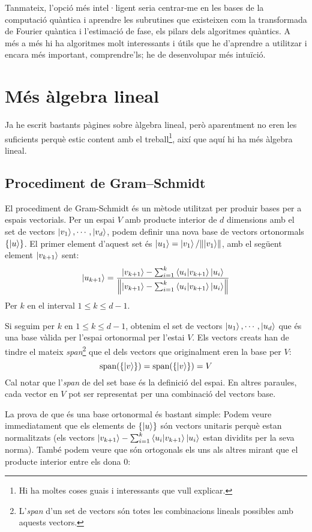 Tanmateix, l'opció més intel·ligent seria centrar-me en les bases de la computació quàntica i aprendre les subrutines que existeixen com la transformada de Fourier quàntica i l'estimació de fase, els pilars dels algoritmes quàntics. A més a més hi ha algoritmes molt interessants i útils que he d'aprendre a utilitzar i encara més important, comprendre'ls; he de desenvolupar més intuïció.

\chapter{Més àlgebra lineal}
Ja he escrit bastants pàgines sobre àlgebra lineal, però aparentment no eren les suficients perquè estic content amb el treball\footnote{Hi ha moltes coses guais i interessants que vull explicar.}, així que aquí hi ha més àlgebra lineal.


\section{Procediment de Gram–Schmidt}\label{gram}
El procediment de Gram-Schmidt és un mètode utilitzat per produir bases per a espais vectorials\cite{QCandQI:GramSchmidt}. Per un espai $V$ amb producte interior de $d$ dimensions amb el set de vectors ${\ket{v_1}, \cdots, \ket{v_d}}$, podem definir una nova base de vectors ortonormals $\{\ket{u}\}$. El primer element d'aquest set és $\ket{u_1} = \ket{v_1}/\norm{\ket{v_1}}$, amb el següent element $\ket{v_{k+1}}$ sent:
$$
\ket{u_{k+1}} = \frac{\ket{v_{k+1}} - \sum_{i=1}^{k} \bra{u_i}\ket{v_{k+1}}\ket{u_i}}{\norm{\ket{v_{k+1}} - \sum_{i=1}^{k} \bra{u_i}\ket{v_{k+1}}\ket{u_i}}}
$$
Per $k$ en el interval $1 \leq k \leq d-1$.

Si seguim per $k$ en $1 \leq k \leq d-1$, obtenim el set de vectors ${\ket{u_1}, \cdots , \ket{u_d}}$ que és una base vàlida per l'espai ortonormal per l'estai $V$. Els vectors creats han de tindre el mateix \textit{span}\footnote{L'\textit{span} d'un set de vectors són totes les combinacions lineals possibles amb aquests vectors.} que el dels vectors que originalment eren la base per $V$:
$$
\text{span}(\{\ket{v}\}) = \text{span}(\{\ket{v}\}) = V
$$
Cal notar que l'\textit{span} de del set base és la definició del espai. En altres paraules, cada vector en $V$ pot ser representat per una combinació del vectors base. 

La prova de que és una base ortonormal és bastant simple:
Podem veure immediatament que els elements de $\{ \ket{u} \}$ són vectors unitaris perquè estan normalitzats (els vectors $\ket{v_{k+1}} - \sum_{i=1}^{k} \bra{u_i}\ket{v_{k+1}}\ket{u_i}$ estan dividits per la seva norma). També podem veure que són ortogonals els uns als altres mirant que el producte interior entre els dona 0:

